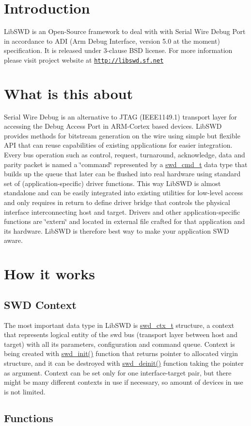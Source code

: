 \hypertarget{index_doc_introduction}{}\section{Introduction}\label{index_doc_introduction}
LibSWD is an Open-\/Source framework to deal with with Serial Wire Debug Port in accordance to ADI (Arm Debug Interface, version 5.0 at the moment) specification. It is released under 3-\/clause BSD license. For more information please visit project website at \href{http://libswd.sf.net}{\tt http://libswd.sf.net} \hypertarget{index_doc_brief}{}\section{What is this about}\label{index_doc_brief}
Serial Wire Debug is an alternative to JTAG (IEEE1149.1) transport layer for accessing the Debug Access Port in ARM-\/Cortex based devices. LibSWD provides methods for bitstream generation on the wire using simple but flexible API that can reuse capabilities of existing applications for easier integration. Every bus operation such as control, request, turnaround, acknowledge, data and parity packet is named a \char`\"{}command\char`\"{} represented by a \hyperlink{structswd__cmd__t}{swd\_\-cmd\_\-t} data type that builds up the queue that later can be flushed into real hardware using standard set of (application-\/specific) driver functions. This way LibSWD is almost standalone and can be easily integrated into existing utilities for low-\/level access and only requires in return to define driver bridge that controls the physical interface interconnecting host and target. Drivers and other application-\/specific functions are \char`\"{}extern\char`\"{} and located in external file crafted for that application and its hardware. LibSWD is therefore best way to make your application SWD aware.\hypertarget{index_doc_details}{}\section{How it works}\label{index_doc_details}
\hypertarget{index_doc_context}{}\subsection{SWD Context}\label{index_doc_context}
The most important data type in LibSWD is \hyperlink{structswd__ctx__t}{swd\_\-ctx\_\-t} structure, a context that represents logical entity of the swd bus (transport layer between host and target) with all its parameters, configuration and command queue. Context is being created with \hyperlink{libswd_8c_ad4f88acc646c06e6e81fbde8117c21af}{swd\_\-init()} function that returns pointer to allocated virgin structure, and it can be destroyed with \hyperlink{libswd_8c_a94b02a9cf4b72e2e76d6a9a34f34f96f}{swd\_\-deinit()} function taking the pointer as argument. Context can be set only for one interface-\/target pair, but there might be many different contexts in use if necessary, so amount of devices in use is not limited.\hypertarget{index_doc_functions}{}\subsection{Functions}\label{index_doc_functions}
